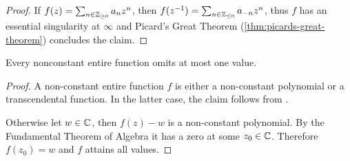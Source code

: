 \begin{proof}
    If $f(z) = \sum_{n \in \mathbb{Z}_{\geq 0}} a_n z^n$, then $f(z^{-1}) = \sum_{n \in \mathbb{Z}_{\leq 0}} a_{-n} z^{n}$, thus $f$ has an essential singularity at $\infty$ and Picard's Great Theorem (\ref{thm:picards-great-theorem}) concludes the claim.
\end{proof}

\begin{corollary} \label{thm:picards-little-theorem}
    Every nonconstant entire function omits at most one value.
\end{corollary}

\begin{proof}
    A non-constant entire function $f$ is either a non-constant polynomial or a transcendental function. In the latter case, the claim follows from .
    
    Otherwise let $w \in \mathbb{C}$, then $f(z) - w$ is a non-constant polynomial. By the Fundamental Theorem of Algebra it has a zero at some $z_0 \in \mathbb{C}$. Therefore $f(z_0) = w$ and $f$ attains all values.
\end{proof}